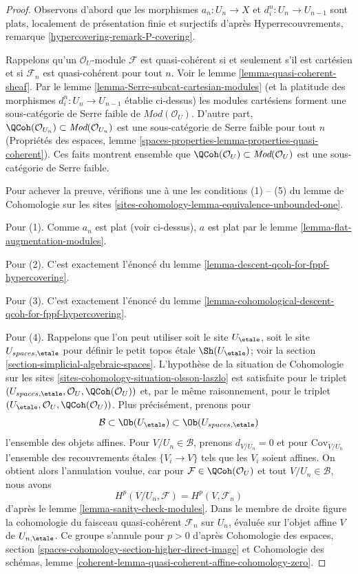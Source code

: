 \begin{proof}
Observons d'abord que les morphismes $a_n : U_n \to X$ et $d^n_i : U_n \to U_{n - 1}$
sont plats, localement de présentation finie et surjectifs d'après
Hyperrecouvrements, remarque \ref{hypercovering-remark-P-covering}.

\medskip\noindent
Rappelons qu'un $\mathcal{O}_U$-module $\mathcal{F}$ est quasi-cohérent si et
seulement s'il est cartésien et si $\mathcal{F}_n$ est quasi-cohérent pour tout $n$.
Voir le lemme \ref{lemma-quasi-coherent-sheaf}.
Par le lemme \ref{lemma-Serre-subcat-cartesian-modules}
(et la platitude des morphismes $d^n_i : U_n \to U_{n - 1}$ établie ci-dessus)
les modules cartésiens forment une sous-catégorie de Serre faible de
$\textit{Mod}(\mathcal{O}_U)$. D'autre part,
$\QCoh(\mathcal{O}_{U_n}) \subset \textit{Mod}(\mathcal{O}_{U_n})$
est une sous-catégorie de Serre faible pour tout $n$
(Propriétés des espaces, lemme
\ref{spaces-properties-lemma-properties-quasi-coherent}).
Ces faits montrent ensemble que
$\QCoh(\mathcal{O}_U) \subset \textit{Mod}(\mathcal{O}_U)$
est une sous-catégorie de Serre faible.

\medskip\noindent
Pour achever la preuve, vérifions une à une les conditions (1) -- (5) du lemme
de Cohomologie sur les sites
\ref{sites-cohomology-lemma-equivalence-unbounded-one}.

\medskip\noindent
Pour (1). Comme $a_n$ est plat (voir ci-dessus), $a$ est plat
par le lemme \ref{lemma-flat-augmentation-modules}.

\medskip\noindent
Pour (2). C'est exactement l'énoncé du
lemme \ref{lemma-descent-qcoh-for-fppf-hypercovering}.

\medskip\noindent
Pour (3). C'est exactement l'énoncé du
lemme \ref{lemma-cohomological-descent-qcoh-for-fppf-hypercovering}.

\medskip\noindent
Pour (4). Rappelons que l'on peut utiliser soit le site $U_\etale$, soit le site
$U_{spaces, \etale}$ pour définir le petit topos \'etale
$\Sh(U_\etale)$; voir la section \ref{section-simplicial-algebraic-spaces}.
L'hypothèse de la situation de Cohomologie
sur les sites \ref{sites-cohomology-situation-olsson-laszlo}
est satisfaite pour le triplet
$(U_{spaces, \etale}, \mathcal{O}_U, \QCoh(\mathcal{O}_U))$
et, par le même raisonnement, pour le triplet
$(U_\etale, \mathcal{O}_U, \QCoh(\mathcal{O}_U))$.
Plus précisément, prenons pour
$$
\mathcal{B} \subset \Ob(U_\etale) \subset \Ob(U_{spaces, \etale})
$$
l'ensemble des objets affines. Pour $V/U_n \in \mathcal{B}$,
prenons $d_{V/U_n} = 0$ et pour $\text{Cov}_{V/U_n}$ l'ensemble des
recouvrements étales $\{V_i \to V\}$ tels que les $V_i$ soient affines.
On obtient alors l'annulation voulue, car pour
$\mathcal{F} \in \QCoh(\mathcal{O}_U)$
et tout $V/U_n \in \mathcal{B}$, nous avons
$$
H^p(V/U_n, \mathcal{F}) = H^p(V, \mathcal{F}_n)
$$
d'après le lemme \ref{lemma-sanity-check-modules}. Dans le
membre de droite figure la cohomologie du faisceau quasi-cohérent
$\mathcal{F}_n$ sur $U_n$, évaluée sur l'objet affine $V$
de $U_{n, \etale}$. Ce groupe s'annule pour $p > 0$ d'après
Cohomologie des espaces, section
\ref{spaces-cohomology-section-higher-direct-image} et Cohomologie des schémas,
lemme
\ref{coherent-lemma-quasi-coherent-affine-cohomology-zero}.


\end{proof}
